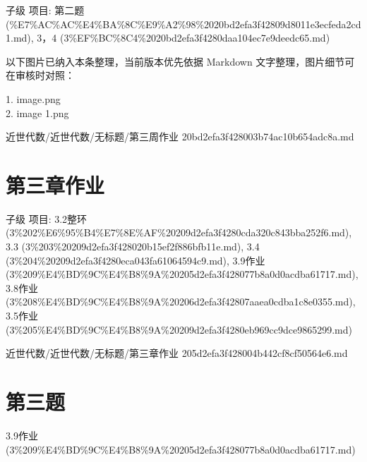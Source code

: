 \begin{homework}

子级 项目: 第二题 (\%E7\%AC\%AC\%E4\%BA\%8C\%E9\%A2\%98\%2020bd2efa3f42809d8011e3ecfeda2cd1.md), 3，4 (3\%EF\%BC\%8C4\%2020bd2efa3f4280daa104ec7e9deedc65.md)

\end{homework}

\begin{note}[关联图片]
以下图片已纳入本条整理，当前版本优先依据 Markdown 文字整理，图片细节可在审核时对照：

1. image.png\\
2. image 1.png\\

\end{note}

\begin{note}[来源路径]

近世代数/近世代数/无标题/第三周作业 20bd2efa3f428003b74ac10b654adc8a.md

\end{note}

\section*{第三章作业}

\begin{homework}

子级 项目: 3.2整环 (3\%202\%E6\%95\%B4\%E7\%8E\%AF\%20209d2efa3f4280cda320c843bba252f6.md), 3.3 (3\%203\%20209d2efa3f428020b15ef2f886bfb11e.md), 3.4 (3\%204\%20209d2efa3f4280eca043fa61064594c9.md), 3.9作业 (3\%209\%E4\%BD\%9C\%E4\%B8\%9A\%20205d2efa3f428077b8a0d0acdba61717.md), 3.8作业 (3\%208\%E4\%BD\%9C\%E4\%B8\%9A\%20206d2efa3f42807aaea0cdba1c8e0355.md), 3.5作业 (3\%205\%E4\%BD\%9C\%E4\%B8\%9A\%20209d2efa3f4280eb969cc9dce9865299.md)

\end{homework}

\begin{note}[来源路径]

近世代数/近世代数/无标题/第三章作业 205d2efa3f428004b442cf8cf50564e6.md

\end{note}

\section*{第三题}

\begin{note}[来源上级主题]

3.9作业 (3\%209\%E4\%BD\%9C\%E4\%B8\%9A\%20205d2efa3f428077b8a0d0acdba61717.md)

\end{note}

